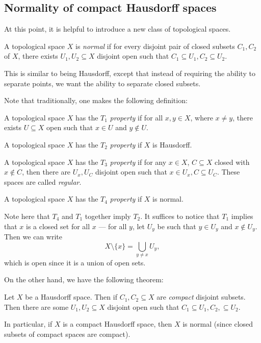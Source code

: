 \documentclass[a4paper]{article}
\begin{document}
\subsection{Normality of compact Hausdorff spaces}
At this point, it is helpful to introduce a new class of topological spaces.
\begin{defi}
  A topological space $X$ is \emph{normal} if for every disjoint pair of closed subsets $C_1, C_2$ of $X$, there exists $U_1, U_2 \subseteq X$ disjoint open such that $C_1 \subseteq U_1, C_2 \subseteq U_2$.
\end{defi}
This is similar to being Hausdorff, except that instead of requiring the ability to separate points, we want the ability to separate closed subsets.

Note that traditionally, one makes the following definition:
\begin{defi}[$T_i$ space]
  A topological space $X$ has the $T_1$ \emph{property} if for all $x, y\in X$, where $x \not= y$, there exists $U\subseteq X$ open such that $x \in U$ and $y\not\in U$.

  A topological space $X$ has the $T_2$ \emph{property} if $X$ is Hausdorff.

  A topological space $X$ has the $T_3$ \emph{property} if for any $x \in X$, $C\subseteq X$ closed with $x \not\in C$, then there are $U_x, U_C$ disjoint open such that $x \in U_x, C\subseteq U_C$. These spaces are called \emph{regular}.

  A topological space $X$ has the $T_4$ \emph{property} if $X$ is normal.
\end{defi}
Note here that $T_4$ and $T_1$ together imply $T_2$. It suffices to notice that $T_1$ implies that $x$ is a closed set for all $x$ --- for all $y$, let $U_y$ be such that $y \in U_y$ and $x \not\in U_y$. Then we can write
\[
  X\setminus \{x\} = \bigcup_{y \not= x}U_y,
\]
which is open since it is a union of open sets.

On the other hand, we have the following theorem:
\begin{thm}
  Let $X$ be a Hausdorff space. Then if $C_1, C_2 \subseteq X$ are \emph{compact} disjoint subsets. Then there are some $U_1, U_2 \subseteq X$ disjoint open such that $C_1 \subseteq U_1, C_2, \subseteq U_2$.

  In particular, if $X$ is a compact Hausdorff space, then $X$ is normal (since closed subsets of compact spaces are compact).
\end{thm}
\end{document}
